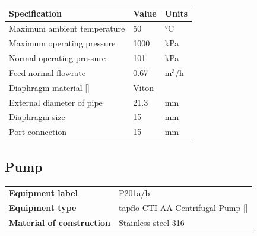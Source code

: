 \begin{table}[H]
\centering
\begin{tabular}{@{}l|l|l@{}}
\toprule
\textbf{Specification}                    & \textbf{Value} & \textbf{Units} \\ \midrule
Maximum ambient temperature                               & 50             & °C             \\ \midrule
Maximum operating pressure                  & 1000        & kPa        \\ \midrule
Normal operating pressure       & 101         &     kPa           \\ \midrule
Feed normal flowrate                      & 0.67      & m$^3$/h           \\ \midrule
Diaphragm material   []                & Viton           &            \\ \midrule
External diameter of pipe                      & 21.3     & mm            \\ \midrule
Diaphragm size & 15     & mm           \\ \midrule
Port connection       & 15         & mm                \\ \bottomrule
\end{tabular}
\end{table}

\newpage
\subsection{Pump}

\begin{table}[H]
    \centering
    \begin{tabular}{@{}l|l@{}}
    \toprule
      \textbf{Equipment label}  & P201a/b \\
       \textbf{Equipment type}  & tapflo CTI AA Centrifugal Pump []\\
       \textbf{Material of construction} & Stainless steel 316 \\
       \bottomrule
    \end{tabular}
\end{table}

